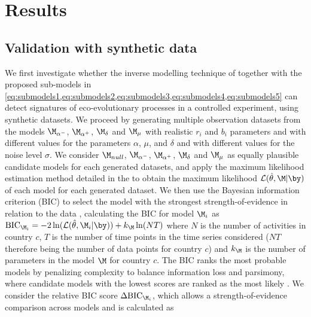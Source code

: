 

\section{Results}
\label{sec:results}
\subsection{Validation with synthetic data}\label{sec:synthetic}
We first investigate whether the inverse modelling technique of \cite{Boussange2022a} together with the proposed sub-models in \cref{eq:submodels1,eq:submodels2,eq:submodels3,eq:submodels4,eq:submodels5} can detect signatures of eco-evolutionary processes in a controlled experiment, using synthetic datasets.
%
We proceed by generating multiple observation datasets from the models $\modalphan$, $\modalphap$, $\M_\delta$ and $\modmu$ with realistic $r_i$ and $b_i$ parameters and with different values for the parameters $\alpha$, $\mu$, and $\delta$ and with different values for the noise level $\sigma$. We consider $\modnull$, $\modalphan$, $\modalphap$, $\M_\delta$ and $\modmu$ as equally plausible candidate models for each generated datasets, and apply the maximum likelihood estimation method detailed in the  to obtain the maximum likelihood $\LL(\hat \theta, \M | \by)$ of each model for each generated dataset. We then use the Bayesian information criterion (BIC) to select the model with the strongest strength-of-evidence in relation to the data \citep{Mangan2017}, calculating the BIC for model $\M_i$ as $\BIC_{\M_i} = -2 \ln(\LL(\hat \theta, \M_i | \by)) + k_{\M} \ln(N T ) $
% 
where $N$ is the number of activities in country $c$, $T$ is the number of time points in the time series considered ($N T$ therefore being the number of data points for country $c$) and $k_{\M}$ is the number of parameters in the model $\M$ for country $c$.
% 
The BIC ranks the most probable models by penalizing complexity to balance information loss and parsimony, where candidate models with the lowest scores are ranked as the most likely \citep{Mangan2017}.
% 
We consider the relative BIC score $\Delta \BIC_{\M_i}$, which allows a strength-of-evidence comparison across models and is calculated as 
